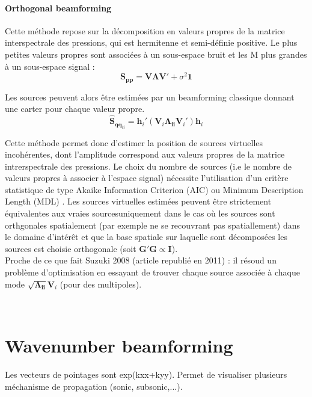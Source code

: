 \paragraph{Orthogonal beamforming}
Cette méthode \citep{Sarradj2010} repose sur la décomposition en valeurs propres de la matrice interspectrale des pressions, qui est hermitenne et semi-définie positive. Le plus petites valeurs propres sont associées à un sous-espace bruit et les M plus grandes à un sous-espace signal : 
\begin{equation}
	\bm{S_{pp}} = \bm{V}\bm{\Lambda}\bm{V}' + \sigma^2\bm{1}
\end{equation}

Les sources peuvent alors être estimées par un beamforming classique donnant une carter pour chaque valeur propre.
\begin{equation}
	\hat{\bm{S}}_{\bm{qq}_{ii}} = \bm{h}_i' (\bm{V}_i \bm{\Lambda_{ii}}\bm{V}_i') \bm{h}_i
\end{equation}

Cette méthode permet donc d'estimer la position de sources virtuelles incohérentes, dont l'amplitude correspond aux valeurs propres de la matrice intrerspectrale des pressions. Le choix du nombre de sources (i.e le nombre de valeurs propres à associer à l'espace signal) nécessite l'utilisation d'un critère statistique de type Akaike Information Criterion (AIC) ou Minimum Description Length (MDL) \citep{Wax1985}. Les sources virtuelles estimées peuvent être strictement équivalentes aux vraies sourcesuniquement dans le cas où les sources sont orthgonales spatialement (par exemple ne se recouvrant pas spatiallement) dans le domaine d'intérêt et que la base spatiale sur laquelle sont décomposées les sources est choisie orthogonale (soit $\bm{G'G}\propto \bm{I}$).\\

Proche de ce que fait Suzuki 2008 (article republié en 2011) : il résoud un problème d'optimisation en essayant de trouver chaque source associée à chaque mode $\sqrt{\bm{\Lambda_{ii}}}\bm{V}_i$ (pour des multipoles). 

~\\ 

\section{Wavenumber beamforming}

Les vecteurs de pointages sont exp(kxx+kyy). Permet de visualiser plusieurs méchanisme de propagation (sonic, subsonic,...).

